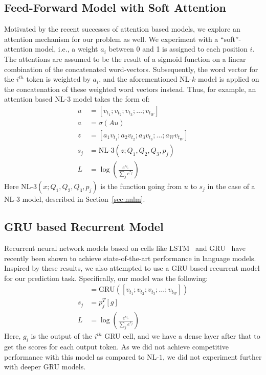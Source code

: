 \subsection{Feed-Forward Model with Soft Attention}
\label{sec:annlm}
Motivated by the recent successes of attention based models, we explore an
attention mechanism for our problem as well. We experiment with a
``soft''-attention model, i.e., a weight $a_i$ between 0 and 1 is assigned to
each position $i$. The attentions are assumed to be the result of a sigmoid
function on a linear combination of the concatenated word-vectors. Subsequently,
the word vector for the $i^{th}$ token is weighted by $a_i$, and the
aforementioned NL-$k$ model is applied on the concatenation of these weighted
word vectors instead. Thus, for example, an attention based NL-$3$ model takes
the form of:
\begin{align}
u &= [v_{t_1}; v_{t_2}; v_{t_3}; \ldots; v_{t_W}]\\
a &= \sigma(Au)\\
z &= [a_1v_{t_1}; a_2v_{t_2}; a_3v_{t_3}; \ldots; a_Wv_{t_W}]\\
s_j &= \text{NL-}3(z ; Q_1, Q_2, Q_3, p_j)\\
L &= \log\left(\frac{e^{s_{t_o}}}{\sum_j{e^{s_j}}}\right)
\end{align}
Here NL-$3(x ; Q_1, Q_2, Q_3, p_j)$ is the function going from $u$ to $s_j$ in
the case of a NL-$3$ model, described in Section~\ref{sec:nnlm}.

\subsection{GRU based Recurrent Model}
\label{sec:rnnlm}
Recurrent neural network models based on cells like LSTM~\cite{ref:lstm} and
GRU~\cite{ref:gru} have recently been shown to achieve state-of-the-art
performance in language models. Inspired by these results, we also attempted to
use a GRU based recurrent model for our prediction task. Specifically, our model
was the following:
\begin{align}
[g_1; g_2; g_3; \ldots; g_{W}] &= \text{GRU}([v_{t_1}; v_{t_2}; v_{t_3}; \ldots;
v_{t_W}])\\
s_j &= p_j^T[g]\\
L &= \log\left(\frac{e^{s_{t_o}}}{\sum_j{e^{s_j}}}\right)
\end{align}
Here, $g_i$ is the output of the $i^{th}$ GRU cell, and we have a dense layer
after that to get the scores for each output token. As we did not achieve
competitive performance with this model as compared to NL-$1$, we did not
experiment further with deeper GRU models.
